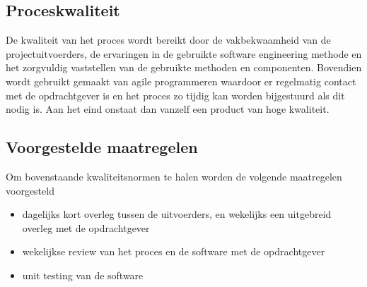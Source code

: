 
\subsection{Proceskwaliteit}
De kwaliteit van het proces wordt bereikt door de vakbekwaamheid van de projectuitvoerders,
de ervaringen in de gebruikte software engineering methode en het zorgvuldig vaststellen van de gebruikte methoden en componenten.
Bovendien wordt gebruikt gemaakt van agile programmeren waardoor er regelmatig contact met de opdrachtgever is en het proces zo tijdig kan worden bijgestuurd als dit nodig is. Aan het eind onstaat dan vanzelf een product van hoge kwaliteit.

\subsection{Voorgestelde maatregelen}
Om bovenstaande kwaliteitsnormen te halen worden de volgende maatregelen voorgesteld
\begin{itemize}
\item dagelijks kort overleg tussen de uitvoerders, en wekelijks een uitgebreid overleg met de opdrachtgever
\item wekelijkse review van het proces en de software met de opdrachtgever
\item unit testing van de software
\end{itemize}




